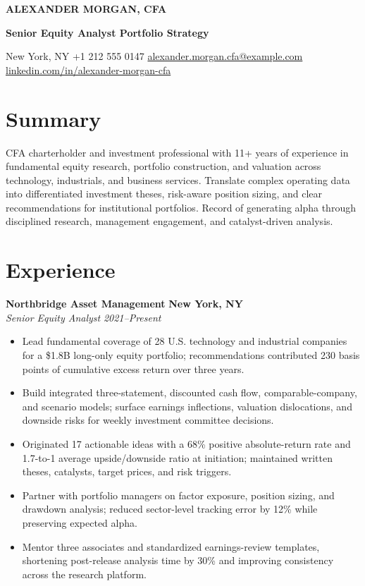 \documentclass[10pt,letterpaper]{article}
\newcommand{\role}[4]{%
  \textbf{#1} \hfill \textbf{#2}\\[-1pt]
  \textit{#3} \hfill \textit{#4}\par
}
\begin{document}
\begin{center}
  {\fontsize{22}{24}\selectfont\bfseries\color{navy} ALEXANDER MORGAN, CFA}\par
  \vspace{2pt}
  {\large\bfseries Senior Equity Analyst \textbar{} Portfolio Strategy}\par
  \vspace{3pt}
  New York, NY \textbar{} +1 212 555 0147 \textbar{}
  \href{mailto:alexander.morgan.cfa@example.com}{alexander.morgan.cfa@example.com}
  \textbar{} \href{https://www.linkedin.com/in/alexander-morgan-cfa}{linkedin.com/in/alexander-morgan-cfa}
\end{center}

\vspace{-3pt}
\section*{Summary}
CFA charterholder and investment professional with 11+ years of experience in fundamental equity research, portfolio construction, and valuation across technology, industrials, and business services. Translate complex operating data into differentiated investment theses, risk-aware position sizing, and clear recommendations for institutional portfolios. Record of generating alpha through disciplined research, management engagement, and catalyst-driven analysis.

\section*{Experience}
\role{Northbridge Asset Management}{New York, NY}{Senior Equity Analyst}{2021--Present}
\begin{itemize}
  \item Lead fundamental coverage of 28 U.S. technology and industrial companies for a \$1.8B long-only equity portfolio; recommendations contributed 230 basis points of cumulative excess return over three years.
  \item Build integrated three-statement, discounted cash flow, comparable-company, and scenario models; surface earnings inflections, valuation dislocations, and downside risks for weekly investment committee decisions.
  \item Originated 17 actionable ideas with a 68\% positive absolute-return rate and 1.7-to-1 average upside/downside ratio at initiation; maintained written theses, catalysts, target prices, and risk triggers.
  \item Partner with portfolio managers on factor exposure, position sizing, and drawdown analysis; reduced sector-level tracking error by 12\% while preserving expected alpha.
  \item Mentor three associates and standardized earnings-review templates, shortening post-release analysis time by 30\% and improving consistency across the research platform.
\end{itemize}
\end{document}
